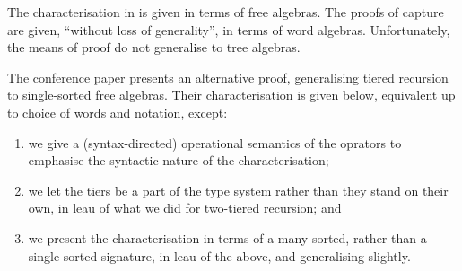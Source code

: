 The characterisation in \cite{leivant-1995} is given in terms of free algebras.
The proofs of capture are given, ``without loss of generality'', in terms of
word algebras. Unfortunately, the means of proof do not generalise to tree
algebras\cite{caseiro-1996, dal-lago-et-al-2010}.

The conference paper \cite{dal-lago-et-al-2010} presents an alternative proof,
generalising tiered recursion to single-sorted free algebras. Their
characterisation is given below, equivalent up to choice of words and notation,
except:

\begin{enumerate}[label=(\arabic*)]

\item we give a (syntax-directed) operational semantics of the oprators to
emphasise the syntactic nature of the characterisation;

\item we let the tiers be a part of the type system rather than they stand on
their own, in leau of what we did for two-tiered recursion; and

\item we present the characterisation in terms of a many-sorted, rather than a
single-sorted signature, in leau of the above, and generalising slightly.

\end{enumerate}


